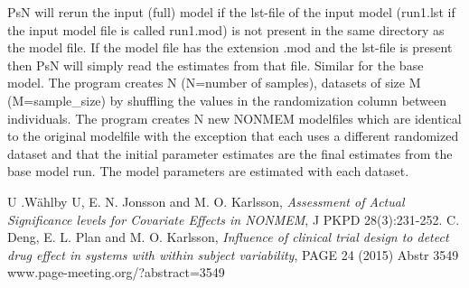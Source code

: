 PsN will rerun the input (full) model if the lst-file of the input model (run1.lst if the input model file is called run1.mod) is not present in the same directory as the model file. 
If the model file has the extension .mod and the lst-file is present then PsN will simply read the estimates from that file. Similar for the base model.
The program creates N (N=number of samples), datasets of size M (M=sample\_size) by shuffling the values in the randomization column between individuals. The program creates N new NONMEM modelfiles which are identical to the original modelfile with the exception that each uses a different randomized dataset and that the initial parameter estimates are the final estimates from the base model run. The model parameters are estimated with each dataset.


\begin{thebibliography}{99}
  U .Wählby U, E. N. Jonsson and M. O. Karlsson, 
\emph{Assessment of Actual Significance levels for Covariate Effects in NONMEM}, 
J PKPD 28(3):231-252. 
 C. Deng, E. L. Plan and M. O. Karlsson, {\em Influence of clinical trial design to detect drug effect in systems with within subject variability}, PAGE 24 (2015) Abstr 3549 \mbox{www.page-meeting.org/?abstract=3549} 
\end{thebibliography}



